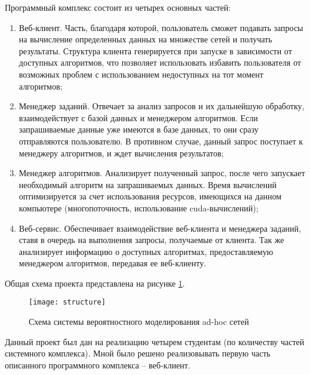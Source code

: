 Программный комплекс состоит из четырех основных частей:
\begin{enumerate}
\item Веб-клиент. Часть, благодаря которой, пользователь сможет подавать запросы на вычисление определенных данных на множестве сетей и получать результаты. Структура клиента генерируется при запуске в зависимости от доступных алгоритмов, что позволяет использовать избавить пользователя от возможных проблем с использованием недоступных на тот момент алгоритмов; 
\item Менеджер заданий. Отвечает за анализ запросов и их дальнейшую обработку, взаимодействует с базой данных и менеджером алгоритмов. Если запрашиваемые данные уже имеются в базе данных, то они сразу отправляются пользователю. В противном случае, данный запрос поступает к менеджеру алгоритмов, и ждет вычисления результатов;
\item Менеджер алгоритмов. Анализирует полученный запрос, после чего запускает необходимый алгоритм на запрашиваемых данных. Время вычислений оптимизируется за счет использования ресурсов, имеющихся на данном компьютере (многопоточность, использование cuda-вычислений);
\item Веб-сервис. Обеспечивает взаимодействие веб-клиента и менеджера заданий, ставя в очередь на выполнения запросы, получаемые от клиента. Так же анализирует информацию о доступных алгоритмах, предоставляемую менеджером алгоритмов, передавая ее веб-клиенту.  
\end{enumerate}
Общая схема проекта представлена на рисунке \ref{structure}.

\begin{figure}[ht]
\center\texttt{[image: structure]}
\caption{Схема системы вероятностного моделирования ad-hoc сетей}\label{structure}
\end{figure}

Данный проект был дан на реализацию четырем студентам (по количеству частей системного комплекса). Мной было решено реализовывать первую часть описанного программного комплекса – веб-клиент. 
